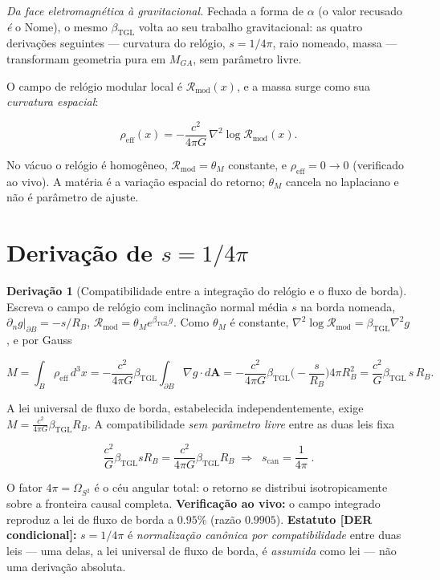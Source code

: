 \documentclass[11pt]{article}
\newcommand{\bTGL}{\beta_{\mathrm{TGL}}}\newcommand{\Msun}{M_{\odot}}\newcommand{\TGL}{\mathrm{TGL}}
\theoremstyle{definition}\newtheorem{deriv}{Derivação}
\begin{document}
\emph{Da face eletromagnética à gravitacional.} Fechada a forma de $\alpha$ (o valor recusado \emph{é} o Nome), o mesmo $\bTGL$ volta ao seu trabalho gravitacional: as quatro derivações seguintes --- curvatura do relógio, $s=1/4\pi$, raio nomeado, massa --- transformam geometria pura em $M_{GA}$, sem parâmetro livre.

O campo de relógio modular local é $\mathcal{R}_{\mathrm{mod}}(x)$, e a massa surge como sua \emph{curvatura espacial}:

\begin{equation}\rho_{\mathrm{eff}}(x)=-\frac{c^2}{4\pi G}\,\nabla^2\log \mathcal{R}_{\mathrm{mod}}(x).\end{equation}

No vácuo o relógio é homogêneo, $\mathcal{R}_{\mathrm{mod}}=\theta_M$ constante, e $\rho_{\mathrm{eff}}=0\to 0$ (verificado ao vivo). A matéria é a variação espacial do retorno; $\theta_M$ cancela no laplaciano e não é parâmetro de ajuste.

\section{Derivação de $s=1/4\pi$}

\begin{deriv}[Compatibilidade entre a integração do relógio e o fluxo de borda]

Escreva o campo de relógio com inclinação normal média $s$ na borda nomeada, $\partial_n g|_{\partial B}=-s/R_B$, $\mathcal{R}_{\mathrm{mod}}=\theta_M e^{\bTGL g}$. Como $\theta_M$ é constante, $\nabla^2\log\mathcal{R}_{\mathrm{mod}}=\bTGL\nabla^2 g$, e por Gauss

\begin{equation}M=\int_B\rho_{\mathrm{eff}}\,d^3x=-\frac{c^2}{4\pi G}\bTGL\!\int_{\partial B}\!\nabla g\cdot d\mathbf{A}=-\frac{c^2}{4\pi G}\bTGL\Big(\!-\frac{s}{R_B}\Big)4\pi R_B^2=\frac{c^2}{G}\bTGL\,s\,R_B.\end{equation}

A lei universal de fluxo de borda, estabelecida independentemente, exige $M=\frac{c^2}{4\pi G}\bTGL R_B$. A compatibilidade \emph{sem parâmetro livre} entre as duas leis fixa

\begin{equation}\frac{c^2}{G}\bTGL s R_B=\frac{c^2}{4\pi G}\bTGL R_B\;\Longrightarrow\;\boxed{\;s_{\mathrm{can}}=\frac{1}{4\pi}\;}.\end{equation}

O fator $4\pi=\Omega_{S^2}$ é o céu angular total: o retorno se distribui isotropicamente sobre a fronteira causal completa. \textbf{Verificação ao vivo:} o campo integrado reproduz a lei de fluxo de borda a $0.95\%$ (razão $0.9905$). \textbf{Estatuto \textsf{[DER condicional]}:} $s=1/4\pi$ é \emph{normalização canônica por compatibilidade} entre duas leis --- uma delas, a lei universal de fluxo de borda, é \emph{assumida} como lei --- não uma derivação absoluta.\end{deriv}
\end{document}
